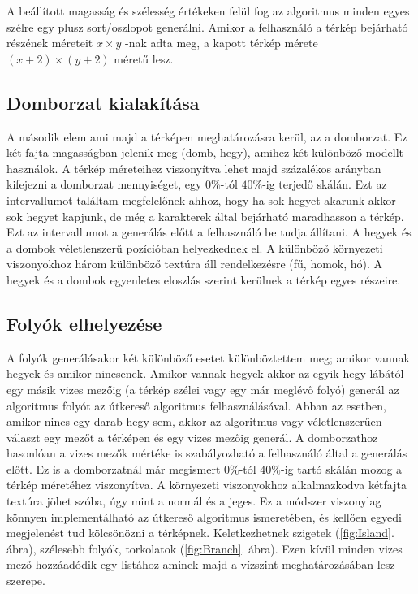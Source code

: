 A beállított magasság és szélesség értékeken felül fog az algoritmus minden egyes szélre egy plusz sort/oszlopot generálni. Amikor a felhasználó a térkép bejárható részének méreteit $x \times y$ -nak adta meg, a kapott térkép mérete $(x+2) \times (y+2)$ méretű lesz.

\subsection{Domborzat kialakítása}

A második elem ami majd a térképen meghatározásra kerül, az a domborzat. Ez két fajta magasságban jelenik meg (domb, hegy), amihez két különböző modellt használok. A térkép méreteihez viszonyítva lehet majd százalékos arányban kifejezni a domborzat mennyiséget, egy $0\%$-tól $40\%$-ig terjedő skálán. Ezt az intervallumot találtam megfelelőnek ahhoz, hogy ha sok hegyet akarunk akkor sok hegyet kapjunk, de még a karakterek által bejárható maradhasson a térkép. Ezt az intervallumot a generálás előtt a felhasználó be tudja állítani. A hegyek és a dombok véletlenszerű pozícióban helyezkednek el. A különböző környezeti viszonyokhoz három különböző textúra áll rendelkezésre (fű, homok, hó). A hegyek és a dombok egyenletes eloszlás szerint kerülnek a térkép egyes részeire.


\subsection{Folyók elhelyezése}

A folyók generálásakor két különböző esetet különböztettem meg; amikor vannak hegyek és amikor nincsenek. Amikor vannak hegyek akkor az egyik hegy lábától egy másik vizes mezőig (a térkép szélei vagy egy már meglévő folyó) generál az algoritmus folyót az útkereső algoritmus felhasználásával. Abban az esetben, amikor nincs egy darab hegy sem, akkor az algoritmus vagy véletlenszerűen választ egy mezőt a térképen és egy vizes mezőig generál. A domborzathoz hasonlóan a vizes mezők mértéke is szabályozható a felhasználó által a generálás előtt. Ez is a domborzatnál már megismert $0\%$-tól $40\%$-ig tartó skálán mozog a térkép méretéhez viszonyítva. A környezeti viszonyokhoz alkalmazkodva kétfajta textúra jöhet szóba, úgy mint a normál és a jeges. Ez a módszer viszonylag könnyen implementálható az útkereső algoritmus ismeretében, és kellően egyedi megjelenést tud kölcsönözni a térképnek. Keletkezhetnek szigetek (\ref{fig:Island}. ábra), szélesebb folyók, torkolatok (\ref{fig:Branch}. ábra). Ezen kívül minden vizes mező hozzáadódik egy listához aminek majd a vízszint meghatározásában lesz szerepe.

